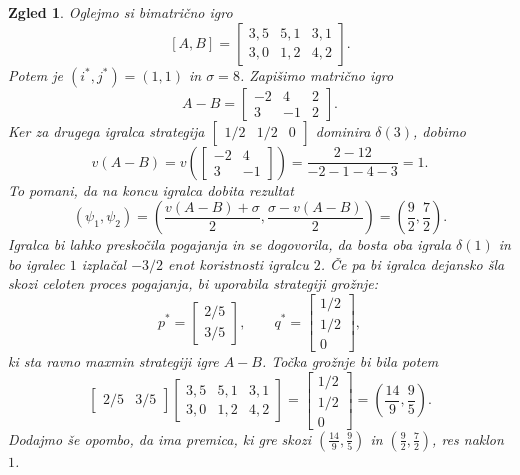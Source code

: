 \documentclass[10pt, a4paper]{article}
\newtheorem{zgled}[izr]{Zgled}
\begin{document}
\begin{zgled}
  Oglejmo si bimatrično igro 
  $$[A, B] = \begin{bmatrix}
    3, 5 & 5, 1 & 3, 1\\
    3, 0 & 1, 2 & 4, 2
  \end{bmatrix}.$$
  Potem je $(i^*, j^*) = (1, 1)$ in $\sigma = 8$.
  Zapišimo matrično igro 
  $$A - B = \begin{bmatrix}
    -2 & 4 & 2\\
    3 & -1 & 2
  \end{bmatrix}.$$
  Ker za drugega igralca strategija $\begin{bmatrix}
    1/2 & 1/2 & 0
  \end{bmatrix}$ dominira $\delta(3)$, dobimo 
  $$v(A - B) = v\left(\begin{bmatrix}
    -2 & 4\\
    3 & -1
  \end{bmatrix}\right) = \frac{2 - 12}{-2-1-4-3} = 1.$$
  To pomani, da na koncu igralca dobita rezultat 
  $$(\psi_1, \psi_2) = \left(\frac{v(A - B) + \sigma}{2}, \frac{\sigma - v(A - B)}{2}\right) = \left(\frac{9}{2}, \frac{7}{2}\right).$$
  Igralca bi lahko preskočila pogajanja in se dogovorila, da bosta oba igrala $\delta(1)$
  in bo igralec $1$ izplačal $-3/2$ enot koristnosti igralcu $2$.
  Če pa bi igralca dejansko šla skozi celoten proces pogajanja, bi uporabila 
  strategiji grožnje:
  $$p^* = \begin{bmatrix}
    2/5\\ 3/5
  \end{bmatrix},\qquad q^* = \begin{bmatrix}
    1/2 \\ 1/2\\ 0
  \end{bmatrix},$$
  ki sta ravno maxmin strategiji igre $A - B$. Točka grožnje bi bila potem 
  $$\begin{bmatrix}
    2/5 & 3/5
  \end{bmatrix} 
  \begin{bmatrix}
    3, 5 & 5, 1 & 3, 1\\
    3, 0 & 1, 2 & 4, 2
  \end{bmatrix} =
  \begin{bmatrix}
    1/2\\ 1/2\\ 0
  \end{bmatrix} = \left(\frac{14}{9}, \frac{9}{5}\right).$$
  Dodajmo še opombo, da ima premica, ki gre skozi $\left(\frac{14}{9}, \frac{9}{5}\right)$ in $\left(\frac{9}{2}, \frac{7}{2}\right)$, res naklon $1$.
\end{zgled}
\end{document}
